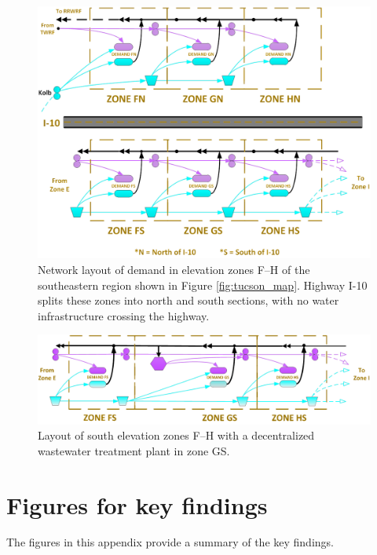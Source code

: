 \documentclass[12pt]{amsart}
\begin{document}
\begin{figure}[!ht]
	\centering
	\includegraphics[width=.8\textwidth]{images/zones_split}
	\caption{
		Network layout of demand in elevation zones F--H of the southeastern region shown in Figure \ref{fig:tucson_map}.
		Highway I-10 splits these zones into north and south sections, with no water infrastructure crossing the highway.\bigskip 
	}
	\label{fig:zones_split}
\end{figure}

\bigskip

\bigskip 

\begin{figure}[!ht]
	\centering
	\includegraphics[width=.8\textwidth]{images/zones_south}
	\caption{
		Layout of south elevation zones F--H with a decentralized wastewater treatment plant in zone GS.\bigskip 
	}
	\label{fig:zones_wwtp}
\end{figure}

\FloatBarrier

\newpage
\FloatBarrier
\section{Figures for key findings}
\label{apx:results}
\FloatBarrier

\bigskip 

The figures in this appendix provide a summary of the key findings.
\end{document}
